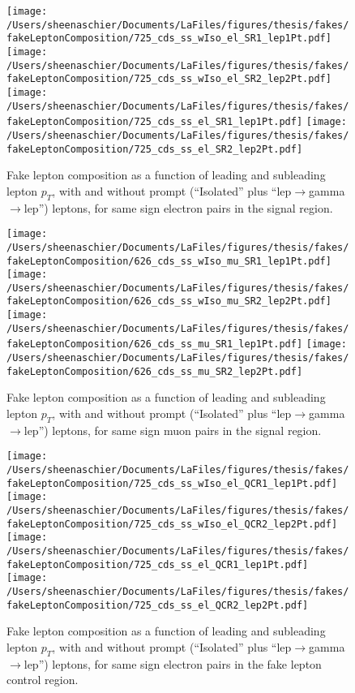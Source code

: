 \documentclass[11pt, oneside]{article}   	%
\begin{document}
\begin{figure}[htb]
        \centering
        \texttt{[image: /Users/sheenaschier/Documents/LaFiles/figures/thesis/fakes/fakeLeptonComposition/725\_cds\_ss\_wIso\_el\_SR1\_lep1Pt.pdf]}
        \texttt{[image: /Users/sheenaschier/Documents/LaFiles/figures/thesis/fakes/fakeLeptonComposition/725\_cds\_ss\_wIso\_el\_SR2\_lep2Pt.pdf]}
        \texttt{[image: /Users/sheenaschier/Documents/LaFiles/figures/thesis/fakes/fakeLeptonComposition/725\_cds\_ss\_el\_SR1\_lep1Pt.pdf]}
        \texttt{[image: /Users/sheenaschier/Documents/LaFiles/figures/thesis/fakes/fakeLeptonComposition/725\_cds\_ss\_el\_SR2\_lep2Pt.pdf]}
        \caption{Fake lepton composition as a function of leading and subleading lepton $p_{T}$, with and without prompt (``Isolated'' plus ``lep$\to$gamma$\to$lep'') leptons, for same sign electron pairs in the signal region.}
        \label{fig:elSSSR}
\end{figure}
\begin{figure}[htb]
        \centering
        \texttt{[image: /Users/sheenaschier/Documents/LaFiles/figures/thesis/fakes/fakeLeptonComposition/626\_cds\_ss\_wIso\_mu\_SR1\_lep1Pt.pdf]}
        \texttt{[image: /Users/sheenaschier/Documents/LaFiles/figures/thesis/fakes/fakeLeptonComposition/626\_cds\_ss\_wIso\_mu\_SR2\_lep2Pt.pdf]}
        \texttt{[image: /Users/sheenaschier/Documents/LaFiles/figures/thesis/fakes/fakeLeptonComposition/626\_cds\_ss\_mu\_SR1\_lep1Pt.pdf]}
        \texttt{[image: /Users/sheenaschier/Documents/LaFiles/figures/thesis/fakes/fakeLeptonComposition/626\_cds\_ss\_mu\_SR2\_lep2Pt.pdf]}
        \caption{Fake lepton composition as a function of leading and subleading lepton $p_{T}$, with and without prompt (``Isolated'' plus ``lep$\to$gamma$\to$lep'') leptons, for same sign muon pairs in the signal region.}
        \label{fig:muSSSR}
\end{figure}
\begin{figure}[htb]
        \centering
        \texttt{[image: /Users/sheenaschier/Documents/LaFiles/figures/thesis/fakes/fakeLeptonComposition/725\_cds\_ss\_wIso\_el\_QCR1\_lep1Pt.pdf]}
        \texttt{[image: /Users/sheenaschier/Documents/LaFiles/figures/thesis/fakes/fakeLeptonComposition/725\_cds\_ss\_wIso\_el\_QCR2\_lep2Pt.pdf]}
        \texttt{[image: /Users/sheenaschier/Documents/LaFiles/figures/thesis/fakes/fakeLeptonComposition/725\_cds\_ss\_el\_QCR1\_lep1Pt.pdf]}
        \texttt{[image: /Users/sheenaschier/Documents/LaFiles/figures/thesis/fakes/fakeLeptonComposition/725\_cds\_ss\_el\_QCR2\_lep2Pt.pdf]}
        \caption{Fake lepton composition as a function of leading and subleading lepton $p_{T}$, with and without prompt (``Isolated'' plus ``lep$\to$gamma$\to$lep'') leptons, for same sign electron pairs in the fake lepton control region.}
        \label{fig:elSSCR}
\end{figure}
\end{document}
